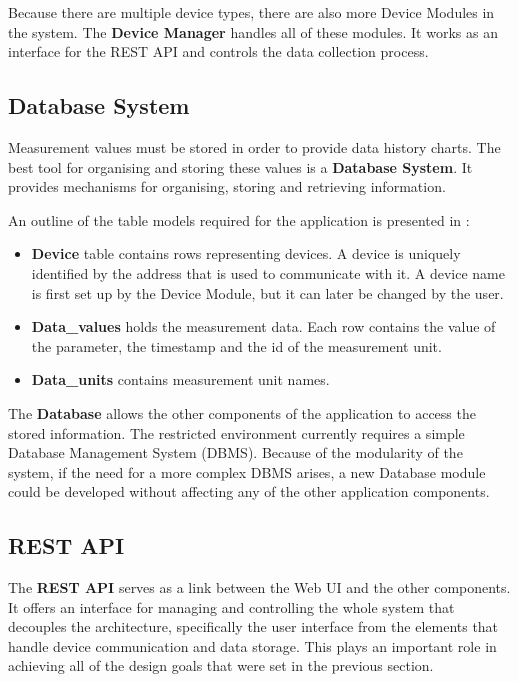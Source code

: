 Because there are multiple device types, there are also more Device Modules in the system. The \textbf{Device Manager} handles all of these modules. It works as an interface for the REST API and controls the data collection process.

\subsection{Database System}

Measurement values must be stored in order to provide data history charts. The best tool for organising and storing these values is a \textbf{Database System}. It provides mechanisms for organising, storing and retrieving information.

An outline of the table models required for the application is presented in :

\begin{itemize}
  \item \textbf{Device} table contains rows representing devices. A device is uniquely identified by the address that is used to communicate with it. A device name is first set up by the Device Module, but it can later be changed by the user.

  \item \textbf{Data_values} holds the measurement data. Each row contains the value of the parameter, the timestamp and the id of the measurement unit.

  \item \textbf{Data_units} contains measurement unit names.
\end{itemize}

The \textbf{Database} allows the other components of the application to access the stored information. The restricted environment currently requires a simple Database Management System (DBMS). Because of the modularity of the system, if the need for a more complex DBMS arises, a new Database module could be developed without affecting any of the other application components.





\subsection{REST API}

The \textbf{REST API} serves as a link between the Web UI and the other components. It offers an interface for managing and controlling the whole system that decouples the architecture, specifically the user interface from the elements that handle device communication and data storage. This plays an important role in achieving all of the design goals that were set in the previous section.

